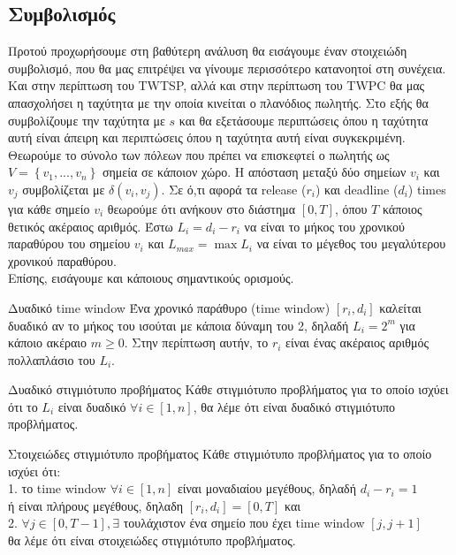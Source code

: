 \documentclass[oneside,12pt]{book}
\theoremstyle{definition}
\begin{document}
\subsection{Συμβολισμός}

Προτού προχωρήσουμε στη βαθύτερη ανάλυση θα εισάγουμε έναν στοιχειώδη συμβολισμό, που θα μας επιτρέψει να γίνουμε περισσότερο κατανοητοί στη συνέχεια. Και στην περίπτωση του TWTSP, αλλά και στην περίπτωση του TWPC θα μας απασχολήσει η ταχύτητα με την οποία κινείται ο πλανόδιος πωλητής. Στο εξής θα συμβολίζουμε την ταχύτητα με \(s\) και θα εξετάσουμε περιπτώσεις όπου η ταχύτητα αυτή είναι άπειρη και περιπτώσεις όπου η ταχύτητα αυτή είναι συγκεκριμένη. Θεωρούμε το σύνολο των πόλεων που πρέπει να επισκεφτεί ο πωλητής ως \(V = \left\{v_1, ..., v_n\right\}\) σημεία σε κάποιον χώρο. Η απόσταση μεταξύ δύο σημείων \(v_i\) και \(v_j\) συμβολίζεται με \(δ(v_i, v_j)\). Σε ό,τι αφορά τα release (\(r_i\)) και deadline (\(d_i\)) times για κάθε σημείο \(v_i\) θεωρούμε ότι ανήκουν στο διάστημα \([0,Τ]\), όπου \(Τ\) κάποιος θετικός ακέραιος αριθμός. Έστω \(L_i = d_i - r_i\) να είναι το μήκος του χρονικού παραθύρου του σημείου \(v_i\) και \(L_{max} = \max L_i\) να είναι το μέγεθος του μεγαλύτερου χρονικού παραθύρου. \\

Επίσης, εισάγουμε και κάποιους σημαντικούς ορισμούς. \\

\begin{mydefinition}{Δυαδικό time window}{}
	Ένα χρονικό παράθυρο (time window) \([r_i, d_i]\) καλείται δυαδικό αν το μήκος του ισούται με κάποια δύναμη του 2, δηλαδή \(L_i = 2^m\) για κάποιο ακέραιο \(m \geq 0\). Στην περίπτωση αυτήν, το \(r_i\) είναι ένας ακέραιος αριθμός πολλαπλάσιο του \(L_i\).
\end{mydefinition}

\begin{mydefinition}{Δυαδικό στιγμιότυπο προβήματος}{}
	Κάθε στιγμιότυπο προβλήματος για το οποίο ισχύει ότι το \(L_i\) είναι δυαδικό \(\forall i \in [1,n]\), θα λέμε ότι είναι δυαδικό στιγμιότυπο προβλήματος.
\end{mydefinition}

\begin{mydefinition}{Στοιχειώδες στιγμιότυπο προβήματος}{}
	Κάθε στιγμιότυπο προβλήματος για το οποίο ισχύει ότι: \\
	1. το time window \(\forall i \in [1,n]\) είναι μοναδιαίου μεγέθους, δηλαδή \( d_i - r_i = 1 \) \\
	ή είναι πλήρους μεγέθους, δηλαδη \([r_i, d_i] = [0,T]\) και \\
	2. \(\forall j \in [0,T-1], \exists\) τουλάχιστον ένα σημείο που έχει time window \([j, j+1]\) \\
	θα λέμε ότι είναι στοιχειώδες στιγμιότυπο προβλήματος.
\end{mydefinition}
\end{document}
